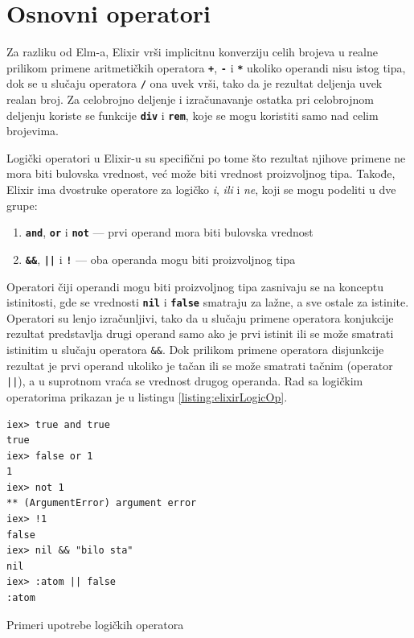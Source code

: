 \documentclass[12pt,oneside]{memoir}
\begin{document}
\section{Osnovni operatori}
Za razliku od Elm-a, Elixir vrši implicitnu konverziju celih brojeva u realne prilikom
primene aritmetičkih operatora \textbf{\texttt{+}}, \textbf{\texttt{-}} i
\textbf{\texttt{*}} ukoliko operandi nisu istog tipa, dok se u slučaju operatora
\textbf{\texttt{/}} ona uvek vrši, tako da je rezultat deljenja uvek realan broj. Za 
celobrojno deljenje i izračunavanje ostatka pri celobrojnom deljenju koriste se funkcije 
\textbf{\texttt{div}} i \textbf{\texttt{rem}}, koje se mogu koristiti samo nad celim brojevima.

Logički operatori u Elixir-u su specifični po tome što rezultat njihove primene ne mora
biti bulovska vrednost, već može biti vrednost proizvoljnog tipa. Takođe, Elixir ima dvostruke operatore
za logičko \emph{i}, \emph{ili} i \emph{ne}, koji se mogu podeliti u dve grupe:
\begin{enumerate}
  \item \textbf{\texttt{and}}, \textbf{\texttt{or}} i \textbf{\texttt{not}} --- prvi operand
  mora biti bulovska vrednost
  \item \textbf{\texttt{\&\&}}, \textbf{\texttt{||}} i \textbf{\texttt{!}} --- oba operanda 
  mogu biti proizvoljnog tipa
\end{enumerate}
Operatori čiji operandi mogu biti proizvoljnog tipa zasnivaju se na konceptu istinitosti, gde
se vrednosti \textbf{\texttt{nil}} i \textbf{\texttt{false}} smatraju za lažne, a sve ostale
za istinite. Operatori su lenjo izračunljivi, tako da u slučaju primene operatora konjukcije
rezultat predstavlja drugi operand samo ako je prvi istinit ili se može smatrati istinitim
u slučaju operatora \texttt{\&\&}. Dok prilikom primene operatora disjunkcije rezultat je
prvi operand ukoliko je tačan ili se može smatrati tačnim (operator \texttt{||}), a u suprotnom vraća
se vrednost drugog operanda. Rad sa logičkim operatorima prikazan je u listingu
\ref{listing:elixirLogicOp}.
\begin{listing}[!h]
\begin{verbatim}
iex> true and true
true
iex> false or 1
1
iex> not 1
** (ArgumentError) argument error
iex> !1
false
iex> nil && "bilo sta"
nil
iex> :atom || false
:atom
\end{verbatim}
\caption{Primeri upotrebe logičkih operatora}
\label{listing:elixirLogicOp}
\end{listing}
\end{document}
